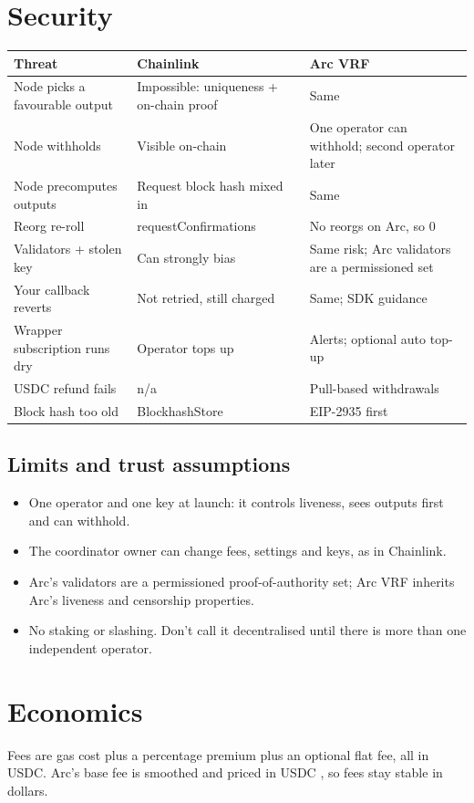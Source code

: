 \documentclass[11pt,a4paper]{article}
\begin{document}
\section{Security}
{\small
\begin{tabularx}{\textwidth}{P{4.0cm}LL}
\toprule
Threat & Chainlink & Arc VRF\\
\midrule
Node picks a favourable output & Impossible: uniqueness + on-chain proof & Same\\
Node withholds & Visible on-chain & One operator can withhold; second operator later\\
Node precomputes outputs & Request block hash mixed in & Same\\
Reorg re-roll & requestConfirmations & No reorgs on Arc, so 0\\
Validators + stolen key & Can strongly bias & Same risk; Arc validators are a permissioned set\\
Your callback reverts & Not retried, still charged & Same; SDK guidance\\
Wrapper subscription runs dry & Operator tops up & Alerts; optional auto top-up\\
USDC refund fails & n/a & Pull-based withdrawals\\
Block hash too old & BlockhashStore & EIP-2935 first\\
\bottomrule
\end{tabularx}}

\subsection*{Limits and trust assumptions}
\begin{itemize}
  \item One operator and one key at launch: it controls liveness, sees outputs first and can withhold.
  \item The coordinator owner can change fees, settings and keys, as in Chainlink.
  \item Arc's validators are a permissioned proof-of-authority set; Arc VRF inherits Arc's liveness and censorship properties.
  \item No staking or slashing. Don't call it decentralised until there is more than one independent operator.
\end{itemize}

\section{Economics}
Fees are gas cost plus a percentage premium plus an optional flat fee, all in USDC. Arc's base fee is smoothed and priced in USDC \cite{arcfee}, so fees stay stable in dollars.
\end{document}
